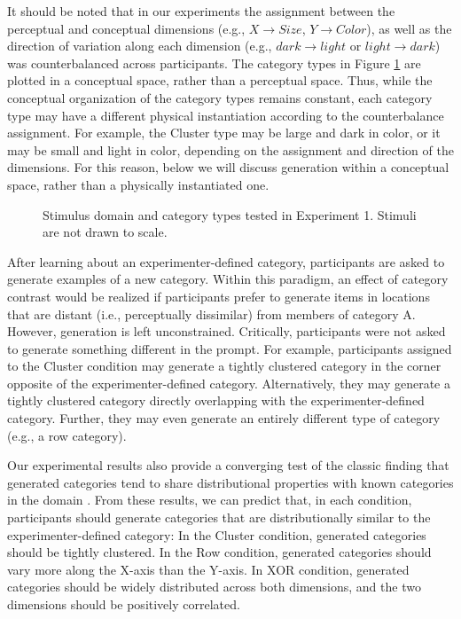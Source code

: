 \documentclass[12pt]{article}
\newcommand\inputpgf[2]{{
\let\pgfimageWithoutPath\pgfimage
\renewcommand{\pgfimage}[2][]{\pgfimageWithoutPath[##1]{#1/##2}}

}}
\begin{document}
\begin{flushleft}
It should be noted that in our experiments the assignment between the perceptual and conceptual dimensions (e.g., $X \rightarrow Size$, $Y \rightarrow Color$), as well as the direction of variation along each dimension (e.g., $dark \rightarrow light$ or $light \rightarrow dark$) was counterbalanced across participants. The category types in Figure \ref{fig:e1-conditions} are plotted in a conceptual space, rather than a perceptual space. Thus, while the conceptual organization of the category types remains constant, each category type may have a different physical instantiation according to the counterbalance assignment. For example, the Cluster type  may be large and dark in color, or it may be small and light in color, depending on the assignment and direction of the dimensions. For this reason, below we will discuss generation within a conceptual space, rather than a physically instantiated one.

\begin{figure}
    \begin{center}
    \inputpgf{figs/}{e1-conditions.pgf}
    \caption{Stimulus domain and category types tested in Experiment 1. Stimuli are not drawn to scale.}
    \label{fig:e1-conditions}
    \end{center}
\end{figure}

After learning about an experimenter-defined category, participants are asked to generate examples of a new category. Within this paradigm, an effect of category contrast would be realized if participants prefer to generate items in locations that are distant (i.e., perceptually dissimilar) from members of category A. However, generation is left unconstrained. Critically, participants were not asked to generate something different in the prompt. For example, participants assigned to the Cluster condition may generate a tightly clustered category in the corner opposite of the experimenter-defined category. Alternatively, they may generate a tightly clustered category directly overlapping with the experimenter-defined category. Further, they may even generate an entirely different type of category (e.g., a row category). 

Our experimental results also provide a converging test of the classic finding that generated categories tend to share distributional properties with known categories in the domain \citep{jern2013probabilistic,ward1994structured}. From these results, we can predict that, in each condition, participants should generate categories that are distributionally similar to the experimenter-defined category: In the Cluster condition, generated categories should be tightly clustered. In the Row condition, generated categories should vary more along the X-axis than the Y-axis. In XOR condition, generated categories should be widely distributed across both dimensions, and the two dimensions should be positively correlated. 


\end{flushleft}
\end{document}
